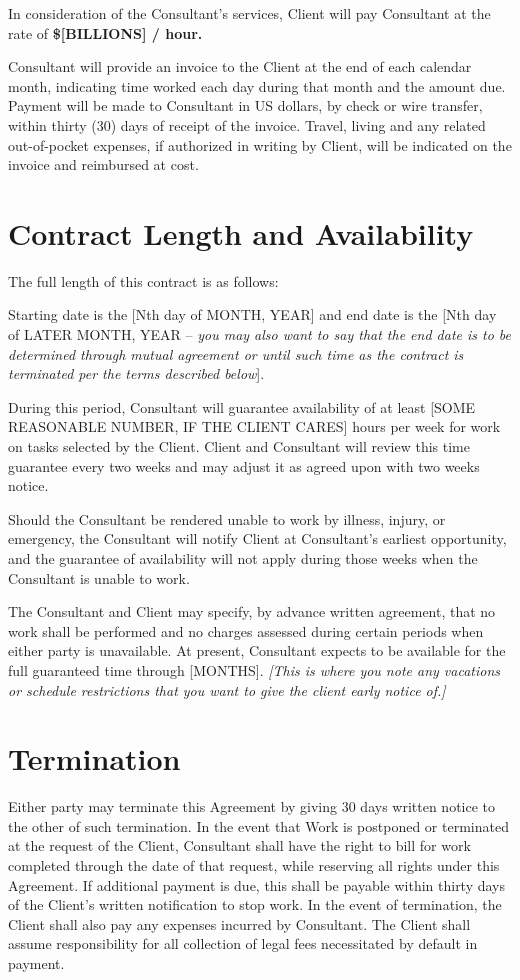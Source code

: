 \documentclass[10pt]{article}
\begin{document}
In consideration of the Consultant's services, Client will pay
Consultant at the rate of {\bf \$[BILLIONS] / hour.}

Consultant will provide an invoice to the Client at the end of each calendar
month, indicating time worked each day during that month and the
amount due.  Payment will be made to Consultant in US dollars, by check or
wire transfer, within thirty (30) days of receipt of the invoice.  Travel,
living and any related out-of-pocket expenses, if authorized in writing by
Client, will be indicated on the invoice and reimbursed at cost.


\section{Contract Length and Availability}

The full length of this contract is as follows:

Starting date is the [Nth day of MONTH, YEAR] and end date is the [Nth day of LATER MONTH, YEAR -- {\em you may also want to say that the end date is to be determined through mutual agreement or until such time as the contract is terminated per the terms described below}].

During this period, Consultant will guarantee availability of at least [SOME REASONABLE NUMBER, IF THE CLIENT CARES]
hours per week for work on tasks selected by the Client.  Client and
Consultant will review this time guarantee every two weeks and may adjust it
as agreed upon with two weeks notice.

Should the Consultant be rendered unable to work by illness, injury, or
emergency, the Consultant will notify Client at Consultant's earliest
opportunity, and the guarantee of availability will not apply during those
weeks when the Consultant is unable to work.

The Consultant and Client may specify, by advance written agreement, that no
work shall be performed and no charges assessed during certain periods when
either party is unavailable.  At present, Consultant expects to be available
for the full guaranteed time through [MONTHS]. {\em [This is where you note any vacations or schedule restrictions that you want to give the client early notice of.]}


\section{Termination}

Either party may terminate this Agreement by giving 30 days written notice
to the other of such termination. In the event that Work is postponed or
terminated at the request of the Client, Consultant shall have the right to
bill %
for work completed through the date of that request, while
reserving all rights under this Agreement. If additional payment is due,
this shall be payable within thirty days of the Client's written
notification to stop work. In the event of termination, the Client shall
also pay any expenses incurred by Consultant.  The Client shall assume
responsibility for all collection of legal fees necessitated by default in
payment.
\end{document}
